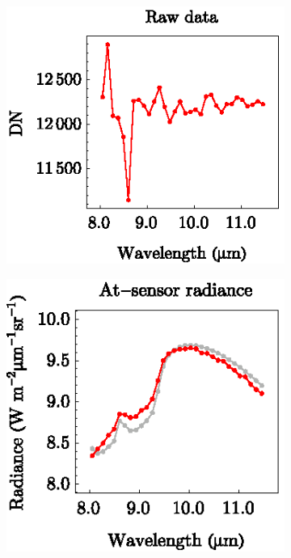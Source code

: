 \begin{figure}[htb]
	\centering
	\vspace{1em}
	\begin{subfigure}[t]{.3\linewidth}
		\centering
		\includegraphics[scale=1]{pics/Chapter_02/calibration-1-DN.eps}
		\vspace{-0.4cm}
		\caption{}
	\end{subfigure}
	\hspace{1em}
	\begin{subfigure}[t]{.3\linewidth}
		\centering
		\includegraphics[scale=1]{pics/Chapter_02/calibration-2-Lm.eps}
		\vspace{-0.4cm}
		\caption{}
	\end{subfigure}

\end{figure}
